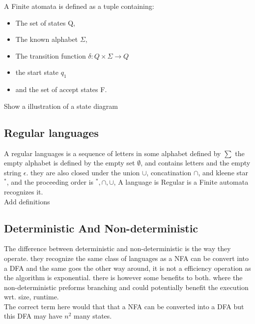 \documentclass[a4paper,10pt,titlepage]{report}
\begin{document}
A Finite atomata is defined as a tuple containing:
\begin{itemize}
\item The set of states Q, 
\item The known alphabet $\Sigma$, 
\item The transition function $\delta: Q \times \Sigma \longrightarrow Q$
\item the start state $q_1$ 
\item and the set of accept states F. \\
\end{itemize} 

Show a illustration of a state diagram

	
\subsection{Regular languages}
	A regular languages is a sequence of letters in some alphabet defined by $\sum$ the empty alphabet is defined by the empty set $ \emptyset $, and contains letters and the empty string $ \epsilon $. they are also closed under the union $ \cup $, concatination $ \cap $, and kleene star $^*$, and the proceeding order is $^*, \cap, \cup$, A language is Regular is a Finite automata recognizes it.\\
	
	Add definitions
	

\subsection{Deterministic And Non-deterministic}

The difference between deterministic and non-deterministic is the way they operate. they recognize the same class of languages as a NFA can be  convert into a DFA and the same goes the other way around, it is not a efficiency operation as the algorithm is exponential. there is however some benefits to both. where the non-deterministic preforms branching and could potentially benefit the execution wrt. size, runtime. \\

The correct term here would that that a NFA can be converted into a DFA but this DFA may have $n^2$ many states.\\
\end{document}
